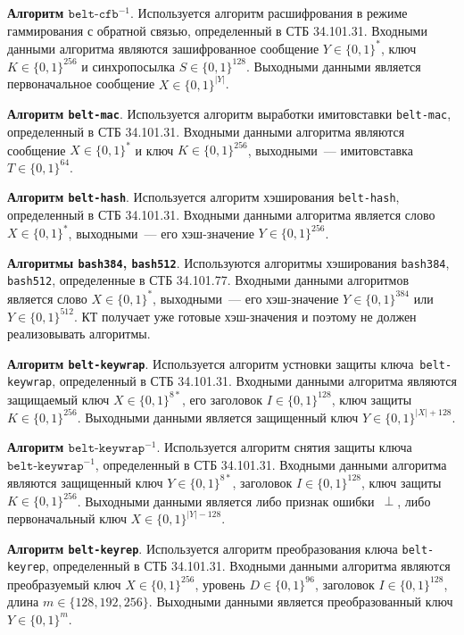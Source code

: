 {\bf Алгоритм $\texttt{belt-cfb}^{-1}$}.
Используется алгоритм расшифрования в режиме 
гаммирования с обратной связью, определенный в СТБ 34.101.31. 
Входными данными алгоритма являются зашифрованное 
сообщение $Y\in\{0,1\}^*$, ключ $K\in\{0,1\}^{256}$ 
и синхропосылка $S\in\{0,1\}^{128}$. Выходными 
данными является первоначальное сообщение $X\in\{0,1\}^{|Y|}$.

{\bf Алгоритм \texttt{belt-mac}}.
Используется алгоритм выработки имитовставки \texttt{belt-mac}, 
определенный в СТБ 34.101.31. Входными данными алгоритма 
являются сообщение $X\in\{0,1\}^*$ и ключ $K\in\{0,1\}^{256}$, 
выходными~--- имитовставка $T\in\{0,1\}^{64}$.

{\bf Алгоритм \texttt{belt-hash}}.
Используется алгоритм хэширования \texttt{belt-hash},
определенный в СТБ 34.101.31. Входными данными алгоритма 
является слово $X\in\{0,1\}^*$, выходными~--- 
его хэш-значение $Y\in\{0,1\}^{256}$.

{\bf Алгоритмы \texttt{bash384}, \texttt{bash512}}.
Используются алгоритмы хэширования \texttt{bash384}, \texttt{bash512},
определенные в СТБ 34.101.77. Входными данными алгоритмов
является слово $X\in\{0,1\}^*$, выходными~--- 
его хэш-значение $Y\in\{0,1\}^{384}$ или $Y\in\{0,1\}^{512}$.
%
КТ получает уже готовые хэш-значения и поэтому не должен реализовывать 
алгоритмы. 

{\bf Алгоритм \texttt{belt-keywrap}}.
Используется алгоритм устновки защиты ключа~\texttt{belt-keywrap}, 
определенный в СТБ 34.101.31. Входными данными алгоритма являются 
защищаемый ключ $X\in\{0,1\}^{8*}$, его заголовок $I\in\{0,1\}^{128}$, ключ 
защиты $K\in\{0,1\}^{256}$. 
Выходными данными является защищенный ключ $Y\in\{0,1\}^{|X|+128}$.

{\bf Алгоритм $\texttt{belt-keywrap}^{-1}$}.
Используется алгоритм снятия защиты ключа~$\texttt{belt-keywrap}^{-1}$, 
определенный в СТБ 34.101.31. Входными данными алгоритма являются 
защищенный ключ $Y\in\{0,1\}^{8*}$, заголовок $I\in\{0,1\}^{128}$, 
ключ защиты $K\in\{0,1\}^{256}$. Выходными данными является либо признак 
ошибки~$\perp$, либо первоначальный ключ $X\in\{0,1\}^{|Y|-128}$.

{\bf Алгоритм \texttt{belt-keyrep}}.
Используется алгоритм преобразования ключа 
\texttt{belt-keyrep}, определенный в СТБ 34.101.31.
Входными данными алгоритма являются преобразуемый ключ $X\in\{0,1\}^{256}$, 
уровень $D\in\{0,1\}^{96}$, заголовок $I\in\{0,1\}^{128}$, 
длина $m\in\{128,192,256\}$. Выходными данными 
является преобразованный ключ $Y\in\{0,1\}^{m}$.

